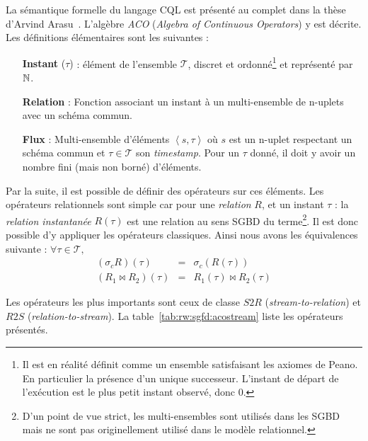 La sémantique formelle du langage CQL est présenté au complet dans la thèse d'Arvind Arasu~\cite{Arasu:queries}. L'algèbre \textit{ACO} (\textit{Algebra of Continuous Operators}) y est décrite. Les définitions élémentaires sont les suivantes : 
\begin{itemize}
 \item[\textbf{Instant} ($\tau$)] : élément de l'ensemble $\mathcal T$, discret et ordonné\footnote{Il est en réalité définit comme un ensemble satisfaisant les axiomes de Peano. En particulier la présence d'un unique successeur. L'instant de départ de l'exécution est le plus petit instant observé, donc $0$.} et représenté par $\mathbb{N}$.
 \item[\textbf{Relation}] : Fonction associant un instant à un multi-ensemble de n-uplets avec un schéma commun.
 \item[\textbf{Flux}] : Multi-ensemble d'éléments $\left<s,\tau\right>$ où $s$ est un n-uplet respectant un schéma commun et $\tau \in \mathcal T$ son \textit{timestamp}. Pour un $\tau$ donné, il doit y avoir un nombre fini (mais non borné) d'éléments.
\end{itemize}
Par la suite, il est possible de définir des opérateurs sur ces éléments. Les opérateurs relationnels sont simple car pour une \textit{relation} $R$, et un instant $\tau$ : la \textit{relation instantanée} $R(\tau)$ est une relation au sens SGBD du terme\footnote{D'un point de vue strict, les multi-ensembles sont utilisés dans les SGBD mais ne sont pas originellement utilisé dans le modèle relationnel.}. Il est donc possible d'y appliquer les opérateurs classiques. Ainsi nous avons les équivalences suivante : $\forall \tau\in\mathcal T,$ 
\begin{eqnarray*}
    (\sigma_c R)(\tau) & = & \sigma_c(R(\tau))\\
    (R_1 \Join R_2)(\tau) & = & R_1(\tau) \Join R_2(\tau)
\end{eqnarray*}

Les opérateurs les plus importants sont ceux de classe $S2R$ (\textit{stream-to-relation}) et $R2S$ (\textit{relation-to-stream}). La table~\ref{tab:rw:sgfd:acostream} liste les opérateurs présentés.
 
